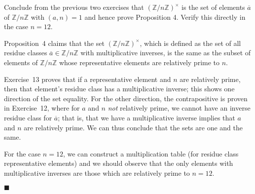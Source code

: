 \documentclass[12pt]{article}
\renewcommand{\qed}{\hfill$\blacksquare$}
\renewenvironment{proof}{\begin{addmargin}[1em]{0em}\begin{newproof}}{\end{newproof}\end{addmargin}\qed}
\newenvironment{problem}[2][Exercise]{\begin{trivlist}
\item[\hskip \labelsep {\bfseries #1}\hskip \labelsep {\bfseries #2.}]}{\end{trivlist}}
\begin{document}
\begin{problem}{0.3.14}
Conclude from the previous two exercises that $\left(\mathbb{Z}/n\mathbb{Z}\right)^{\times}$ is the set of elements $\overline{a}$ of $\mathbb{Z}/n\mathbb{Z}$ with $\left(a,n\right)=1$ and hence prove Proposition 4. Verify this directly in the case $n=12$.
\end{problem}
\begin{proof}
Proposition~4 claims that the set $\left(\mathbb{Z}/n\mathbb{Z}\right)^{\times}$, which is defined as the set of all residue classes $\overline{a}\in \mathbb{Z}/n\mathbb{Z}$ with multiplicative inverses, is the same as the subset of elements of $\mathbb{Z}/n\mathbb{Z}$ whose representative elements are relatively prime to $n$.

Exercise~13 proves that if a representative element and $n$ are relatively prime, then that element's residue class has a multiplicative inverse; this shows one direction of the set equality. For the other direction, the contrapositive is proven in Exercise~12, where for $a$ and $n$ \textit{not} relatively prime, we cannot have an inverse residue class for $\overline{a}$; that is, that we have a multiplicative inverse implies that $a$ and $n$ are relatively prime. We can thus conclude that the sets are one and the same.

For the case $n = 12$, we can construct a multiplication table (for residue class representative elements) and we should observe that the only elements with multiplicative inverses are those which are relatively prime to $n=12$.


\end{proof}
\end{document}
